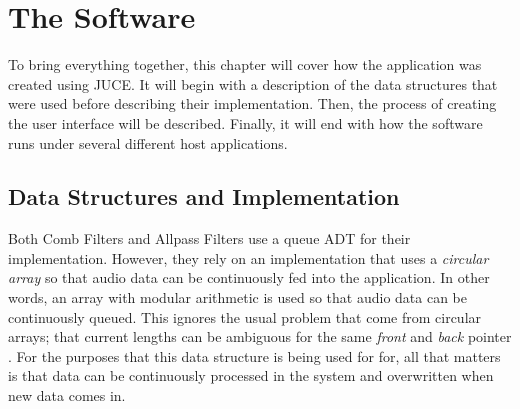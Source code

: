\chapter{The Software}
\hspace*{-0.15cm}To bring everything together, this chapter will cover how the application was created using JUCE. It will begin with a description of the data structures that were used before describing their implementation. Then, the process of creating the user interface will be described. Finally, it will end with how the software runs under several different host applications.
\section{Data Structures and Implementation}
Both Comb Filters and Allpass Filters use a queue ADT for their implementation. However, they rely on an implementation that uses a \textit{circular array} so that audio data can be continuously fed into the application. In other words, an array with modular arithmetic is used so that audio data can be continuously queued. This ignores the usual problem that come from circular arrays; that current lengths can be ambiguous for the same \textit{front} and \textit{back} pointer \cite{carrano2016data}. For the purposes that this data structure is being used for for, all that matters is that data can be continuously processed in the system and overwritten when new data comes in.

